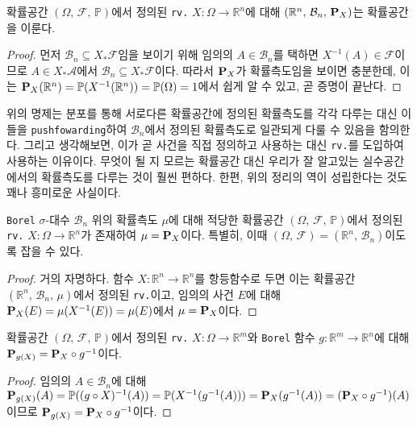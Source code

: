 \begin{proposition}\label{prop:rvProbSpace}
    확률공간 $(\Omega,\,\mathcal{F},\,\mathbb{P})$에서 정의된 \texttt{rv.} $X:\Omega\to\mathbb{R}^n$에 대해 $(\mathbb{R}^n,\,\mathcal{B}_n,\,\mathbf{P}_X)$는 확률공간을 이룬다.
\end{proposition}

\begin{proof}
    먼저 $\mathcal{B}_n\subseteq X_*\mathcal{F}$임을 보이기 위해 임의의 $A\in\mathcal{B}_n$를 택하면 $X^{-1}(A)\in\mathcal{F}$이므로 $A\in X_*\mathcal{A}$에서 $\mathcal{B}_n\subseteq X_*\mathcal{F}$이다. 따라서 $\mathbf{P}_X$가 확률측도임을 보이면 충분한데, 이는 $\mathbf{P}_X(\mathbb{R}^n)=\mathbb{P}(X^{-1}(\mathbb{R}^n))=\mathbb{P}(\Omega)=1$에서 쉽게 알 수 있고, 곧 증명이 끝난다.
\end{proof}

위의 명제는 분포를 통해 서로다른 확률공간에 정의된 확률측도를 각각 다루는 대신 이들을 \texttt{pushfowarding}하여 $\mathcal{B}_n$에서 정의된 확률측도로 일관되게 다룰 수 있음을 함의한다. 그리고 생각해보면, 이가 곧 사건을 직접 정의하고 사용하는 대신 \texttt{rv.}를 도입하여 사용하는 이유이다. 무엇이 될 지 모르는 확률공간 대신 우리가 잘 알고있는 실수공간에서의 확률측도를 다루는 것이 훨씬 편하다. 한편, 위의 정리의 역이 성립한다는 것도 꽤나 흥미로운 사실이다.

\begin{theorem}\label{thm:probSpaceRv}
    \texttt{Borel} $\sigma$-대수 $\mathcal{B}_n$ 위의 확률측도 $\mu$에 대해 적당한 확률공간 $(\Omega,\,\mathcal{F},\,\mathbb{P})$에서 정의된 \texttt{rv.} $X:\Omega\to\mathbb{R}^n$가 존재하여 $\mu=\mathbf{P}_X$이다. 특별히, 이때 $(\Omega,\,\mathcal{F})=(\mathbb{R}^n,\,\mathcal{B}_n)$이도록 잡을 수 있다.
\end{theorem}

\begin{proof}
    거의 자명하다. 함수 $X:\mathbb{R}^n\to\mathbb{R}^n$를 항등함수로 두면 이는 확률공간 $(\mathbb{R}^n,\,\mathcal{B}_n,\,\mu)$에서 정의된 \texttt{rv.}이고, 임의의 사건 $E$에 대해 $\mathbf{P}_X(E)=\mu(X^{-1}(E))=\mu(E)$에서 $\mu=\mathbf{P}_X$이다.
\end{proof}

\begin{theorem}
    확률공간 $(\Omega,\,\mathcal{F},\,\mathbb{P})$에서 정의된 \texttt{rv.} $X:\Omega\to\mathbb{R}^m$와 \texttt{Borel} 함수 $g:\mathbb{R}^m\to\mathbb{R}^n$에 대해 $\mathbf{P}_{g(X)}=\mathbf{P}_X\circ g^{-1}$이다.
\end{theorem}

\begin{proof}
    임의의 $A\in\mathcal{B}_n$에 대해 $\mathbf{P}_{g(X)}(A)=\mathbb{P}((g\circ X)^{-1}(A))=\mathbb{P}(X^{-1}(g^{-1}(A)))=\mathbf{P}_X(g^{-1}(A))=(\mathbf{P}_X\circ g^{-1})(A)$이므로 $\mathbf{P}_{g(X)}=\mathbf{P}_X\circ g^{-1}$이다.
\end{proof}

